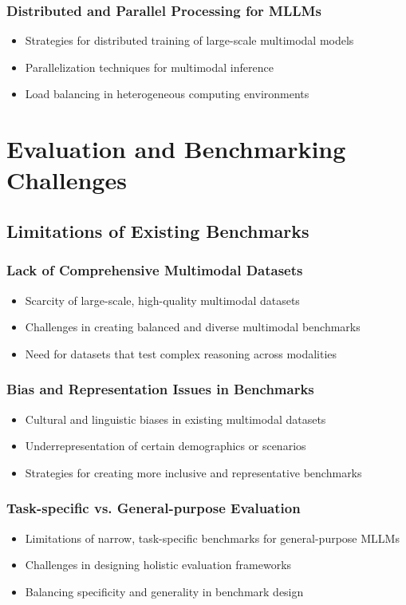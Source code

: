 \subsubsection{Distributed and Parallel Processing for MLLMs}
\begin{itemize}
    \item Strategies for distributed training of large-scale multimodal models
    \item Parallelization techniques for multimodal inference
    \item Load balancing in heterogeneous computing environments
\end{itemize}

\section{Evaluation and Benchmarking Challenges}

\subsection{Limitations of Existing Benchmarks}
\subsubsection{Lack of Comprehensive Multimodal Datasets}
\begin{itemize}
    \item Scarcity of large-scale, high-quality multimodal datasets
    \item Challenges in creating balanced and diverse multimodal benchmarks
    \item Need for datasets that test complex reasoning across modalities
\end{itemize}

\subsubsection{Bias and Representation Issues in Benchmarks}
\begin{itemize}
    \item Cultural and linguistic biases in existing multimodal datasets
    \item Underrepresentation of certain demographics or scenarios
    \item Strategies for creating more inclusive and representative benchmarks
\end{itemize}

\subsubsection{Task-specific vs. General-purpose Evaluation}
\begin{itemize}
    \item Limitations of narrow, task-specific benchmarks for general-purpose MLLMs
    \item Challenges in designing holistic evaluation frameworks
    \item Balancing specificity and generality in benchmark design
\end{itemize}

